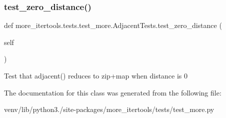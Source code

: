 \subsubsection{\texorpdfstring{test\+\_\+zero\+\_\+distance()}{test\_zero\_distance()}}
{\footnotesize\ttfamily def more\+\_\+itertools.\+tests.\+test\+\_\+more.\+Adjacent\+Tests.\+test\+\_\+zero\+\_\+distance (\begin{DoxyParamCaption}\item[{}]{self }\end{DoxyParamCaption})}

\begin{DoxyVerb}Test that adjacent() reduces to zip+map when distance is 0\end{DoxyVerb}
 

The documentation for this class was generated from the following file\+:\begin{DoxyCompactItemize}
\item 
venv/lib/python3./site-\/packages/more\+\_\+itertools/tests/test\+\_\+more.\+py\end{DoxyCompactItemize}
